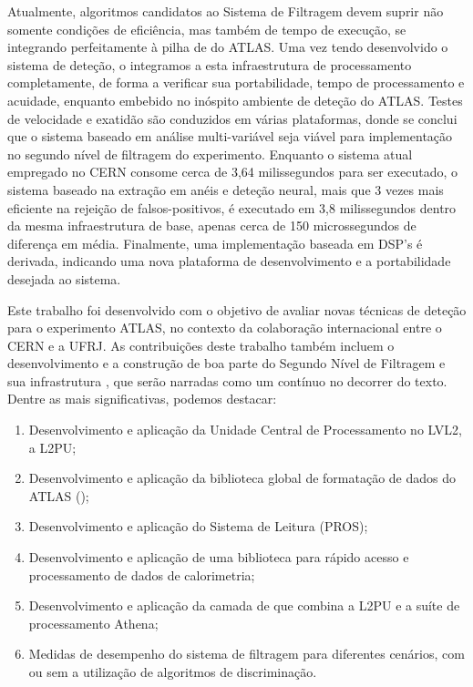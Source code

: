 Atualmente, algoritmos candidatos ao Sistema de Filtragem devem suprir não
somente condições de eficiência, mas também de tempo de execução, se
integrando perfeitamente à pilha de  do ATLAS. Uma vez tendo
desenvolvido o sistema de deteção, o integramos a esta infraestrutura de
processamento completamente, de forma a verificar sua portabilidade, tempo de
processamento e acuidade, enquanto embebido no inóspito ambiente de deteção do
ATLAS. Testes de velocidade e exatidão são conduzidos em várias plataformas,
donde se conclui que o sistema baseado em análise multi-variável seja viável
para implementação no segundo nível de filtragem do experimento. Enquanto o
sistema atual empregado no CERN consome cerca de 3,64 milissegundos para ser
executado, o sistema baseado na extração em anéis e deteção neural, mais que 3
vezes mais eficiente na rejeição de falsos-positivos, é executado em 3,8
milissegundos dentro da mesma infraestrutura de base, apenas cerca de 150
microssegundos de diferença em média. Finalmente, uma implementação baseada em
DSP's é derivada, indicando uma nova plataforma de desenvolvimento e a
portabilidade desejada ao sistema.

Este trabalho foi desenvolvido com o objetivo de avaliar novas técnicas de
deteção para o experimento ATLAS, no contexto da colaboração internacional
entre o CERN e a UFRJ. As contribuições deste trabalho também incluem o
desenvolvimento e a construção de boa parte do Segundo Nível de Filtragem e sua
infrastrutura , que serão narradas como um contínuo no decorrer do
texto. Dentre as mais significativas, podemos destacar:

\begin{enumerate}
\item Desenvolvimento e aplicação da Unidade Central de Processamento no
LVL2, a L2PU;
\item Desenvolvimento e aplicação da biblioteca global de formatação de dados
do ATLAS ();
\item Desenvolvimento e aplicação do  Sistema de Leitura (PROS);
\item Desenvolvimento e aplicação de uma biblioteca para rápido acesso e
processamento de dados de calorimetria;
\item Desenvolvimento e aplicação da camada de  que combina a
L2PU e a suíte de processamento  Athena;
\item Medidas de desempenho do sistema de filtragem para diferentes cenários,
com ou sem a utilização de algoritmos de discriminação.
\end{enumerate}

